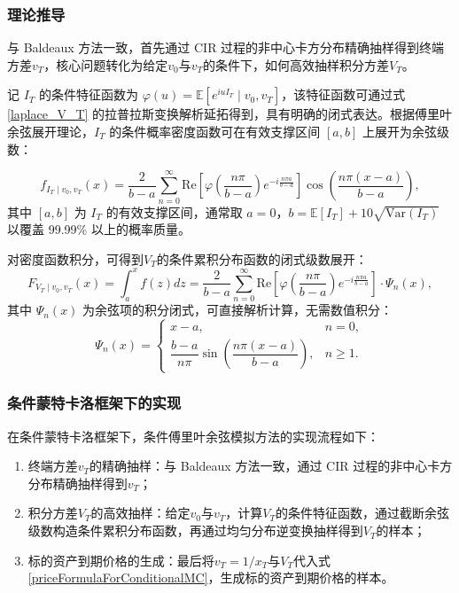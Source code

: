 \subsubsection{理论推导}
与 Baldeaux 方法一致，首先通过 CIR 过程的非中心卡方分布精确抽样得到终端方差$v_T$，核心问题转化为给定$v_0$与$v_T$的条件下，如何高效抽样积分方差$V_T$。

记 $I_T$ 的条件特征函数为 $\varphi(u) = \mathbb{E}\left[ e^{iuI_T} \mid v_0, v_T \right]$，该特征函数可通过式 \eqref{laplace_V_T} 的拉普拉斯变换解析延拓得到，具有明确的闭式表达。根据傅里叶余弦展开理论，$I_T$ 的条件概率密度函数可在有效支撑区间 $[a,b]$ 上展开为余弦级数：

\begin {equation}
  f_{I_T \mid v_0, v_T}(x) = \frac {2}{b-a} \sum_{n=0}^\infty \text {Re}\left [ \varphi\left ( \frac {n\pi}{b-a} \right) e^{-i \frac {n\pi a}{b-a}} \right] \cos\left ( \frac {n\pi (x-a)}{b-a} \right),
\end {equation}
其中 $[a,b]$ 为 $I_T$ 的有效支撑区间，通常取 $a = 0$，$b = \mathbb{E}[I_T] + 10\sqrt{\mathrm{Var}(I_T)}$ 以覆盖 99.99\% 以上的概率质量。

对密度函数积分，可得到$V_T$的条件累积分布函数的闭式级数展开：
\begin {equation}
  F_{V_T \mid v_0, v_T}(x) = \int_a^x f (z) dz = \frac {2}{b-a} \sum_{n=0}^\infty \text {Re}\left [ \varphi\left ( \frac {n\pi}{b-a} \right) e^{-i \frac {n\pi a}{b-a}} \right] \cdot \Psi_n (x),
\end {equation}
其中 $\Psi_n(x)$ 为余弦项的积分闭式，可直接解析计算，无需数值积分：
\begin{equation}
\Psi_n(x) =
\begin{cases} 
x - a, & n = 0, \\
\dfrac{b-a}{n\pi} \sin\left( \dfrac{n\pi (x-a)}{b-a} \right), & n \geq 1.
\end{cases}
\end{equation}
\subsubsection{条件蒙特卡洛框架下的实现}
在条件蒙特卡洛框架下，条件傅里叶余弦模拟方法的实现流程如下：
\begin{enumerate}
  \item 终端方差$v_T$的精确抽样：与 Baldeaux 方法一致，通过 CIR 过程的非中心卡方分布精确抽样得到$v_T$；
  \item 积分方差$V_T$的高效抽样：给定$v_0$与$v_T$，计算$V_T$的条件特征函数，通过截断余弦级数构造条件累积分布函数，再通过均匀分布逆变换抽样得到$V_T$的样本；
  \item 标的资产到期价格的生成：最后将$v_T=1/x_T$与$V_T$代入式 \eqref{priceFormulaForConditionalMC}，生成标的资产到期价格的样本。
\end{enumerate}

